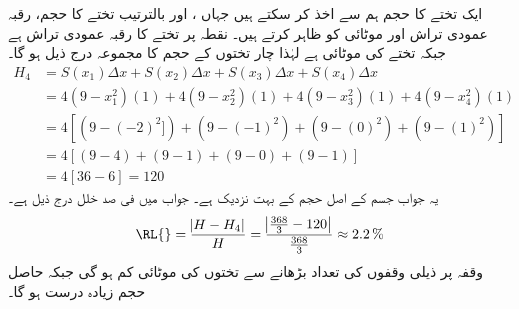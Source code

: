 ایک تختے کا حجم  ہم  سے اخذ کر سکتے ہیں جہاں ،  اور  بالترتیب تختے کا حجم، رقبہ عمودی تراش اور موٹائی کو ظاہر کرتے ہیں۔ نقطہ  پر تختے کا رقبہ عمودی تراش  ہے جبکہ تختے کی موٹائی  ہے لہٰذا چار تختوں کے حجم کا مجموعہ درج ذیل ہو گا۔
\begin{align*}
H_4&=S(x_1)\Delta x+S(x_2)\Delta x+S(x_3)\Delta x+S(x_4)\Delta x\\
&=4(9-x_1^2)(1)+4(9-x_2^2)(1)+4(9-x_3^2)(1)+4(9-x_4^2)(1)\\
&=4[(9-(-2)^2])+(9-(-1)^2)+(9-(0)^2)+(9-(1)^2)]\\
&=4[(9-4)+(9-1)+(9-0)+(9-1)]\\
&=4[36-6]=120
\end{align*} 
یہ جواب  جسم کے اصل حجم  کے بہت نزدیک ہے۔ جواب میں فی صد خلل درج ذیل ہے۔
\begin{align*}
\text{\RL{}}=\frac{\abs{H-H_4}}{H}=\frac{\abs{\tfrac{368}{3}-120}}{\tfrac{368}{3}}\approx \SI{2.2}{\percent}
\end{align*}
وقفہ  پر ذیلی وقفوں  کی تعداد بڑھانے سے تختوں کی موٹائی کم ہو گی جبکہ حاصل حجم زیادہ درست ہو گا۔
